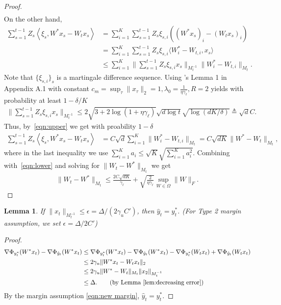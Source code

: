 \documentclass{article}
\newcommand{\nb}{\nabla}
\newcommand{\inner}[1]{ \left\langle {#1} \right\rangle }
\newtheorem{lemma}[theorem]{Lemma}
\begin{document}
\begin{proof}
\begin{align}
\end{align}
On the other hand, 
\begin{align}
    \sum_{s=1}^{t-1} Z_s\inner{\xi_s, W^*x_s-W_tx_s} &= \sum_{i=1}^K  \sum_{s=1}^{t-1} Z_s\xi_{s,i} ((W^*x_s)_i-(W_tx_s)_i) \nonumber \\
    & = \sum_{i=1}^K  \sum_{s=1}^{t-1} Z_s\xi_{s,i} \langle W^*_i-W_{t,i}, x_s\rangle \nonumber \\
    &\leq \sum_{i=1}^K \Bigg\| \sum_{s=1}^{t-1} Z_s\xi_{s,i}x_s \Bigg\|_{M_t^{-1}} \|W^*_i-W_{t,i}\|_{M_t}.   \label{eqn:upper}
\end{align}
Note that $\{\xi_{s,i}\}_{s}$ is a martingale difference sequence. Using \cite{filippi2010parametric}'s Lemma 1 in Appendix A.1 with constant $c_m = \sup_\tau\|x_\tau\|_2=1, \lambda_0 = \frac{1}{\eta\gamma_\ell}, R=2$ yields with probability at least $1-\delta/K$
\begin{align*}
    \Bigg\| \sum_{s=1}^{t-1} Z_s\xi_{s,i}x_s \Bigg\|_{M_t^{-1}} \leq 2\sqrt{3+2\log(1+\eta\gamma_\ell)}\sqrt{d\log t}\sqrt{\log(dK/\delta)} \triangleq \sqrt{d}C.
\end{align*}
Thus, by~\eqref{eqn:upper} we get with proability $1-\delta$
\begin{align*}
    \sum_{s=1}^{t-1} Z_s\inner{\xi_s, W^*x_s-W_tx_s} &= C\sqrt{d}\sum_{i=1}^K \|W^*_i-W_{t,i}\|_{M_t} = C\sqrt{dK} \|W^*-W_{t}\|_{M_t}, 
\end{align*}
where in the last inequality we use $\sum_{i=1}^K a_i\leq \sqrt{K}\sqrt{\sum_{i=1}^K a_i^2}$. Combining with~\eqref{eqn:lower} and solving for $\|W_t-W^*\|_{M_t}$ we get 
\begin{align*}
    \|W_t-W^*\|_{M_t} \leq \frac{2C\sqrt{dK}}{\gamma_\ell} + \sqrt{\frac{2}{\eta \gamma_\ell}}\sup_{W\in \Omega}\|W\|_F. 
\end{align*}

\end{proof}



\begin{lemma}
\label{lem: xbounded}
If $\|x_t\|_{M_t^{-1}}\leq \epsilon = \Delta/(2\gamma_u C')$, then $\hat{y}_t=y^*_t$. {\color{blue}(For Type 2 margin assumption, we set $\epsilon=\Delta/2C'$)}
\end{lemma}
\begin{proof}
\begin{align*}
\nb \Phi_{y_t^*}(W^*x_t) - \nb\Phi_{\hat{y}_t}(W^*x_t) 
 &\leq \nb \Phi_{y_t^*}(W^*x_t) -    \nb\Phi_{\hat{y}_t}(W^*x_t) 
 - \nb \Phi_{y_t^*}(W_tx_t) + \nb \Phi_{\hat{y}_t}(W_tx_t) \\
 & \leq 2\gamma_u \|W^*x_t-W_tx_t\|_2 \\
 & \leq 2\gamma_u \|W^*-W_t\|_{M_t}\|x_2\|_{M_t^{-1}} \\
 & \leq \Delta. \tag{by Lemma~\ref{lem:decreasing error}}
\end{align*}
By the margin assumption \eqref{eqn:new margin}, $\hat{y}_t = y_t^*$. 
\end{proof}
\end{document}
